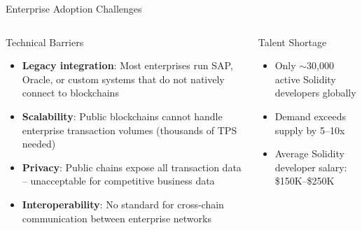 \documentclass[8pt,aspectratio=169]{beamer}
\begin{document}
\begin{frame}{Enterprise Adoption Challenges}
\begin{columns}[T]
\begin{block}{Technical Barriers}
\footnotesize
\begin{itemize}
  \item \textbf{Legacy integration}: Most enterprises run SAP, Oracle, or custom systems that do not natively connect to blockchains
  \item \textbf{Scalability}: Public blockchains cannot handle enterprise transaction volumes (thousands of TPS needed)
  \item \textbf{Privacy}: Public chains expose all transaction data -- unacceptable for competitive business data
  \item \textbf{Interoperability}: No standard for cross-chain communication between enterprise networks
\end{itemize}
\end{block}
\vspace{2mm}
\begin{alertblock}{Talent Shortage}
\footnotesize
\begin{itemize}
  \item Only $\sim$30,000 active Solidity developers globally
  \item Demand exceeds supply by 5--10x
  \item Average Solidity developer salary: \$150K--\$250K
\end{itemize}
\end{alertblock}


\end{columns}
\end{frame}
\end{document}
